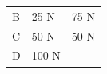 \begin{enumerate}[noitemsep, label=\textbf{\arabic*}. ]
{{\begin{center}
\begin{xtabular}[t]{|l|l|l|}
    
        B &
    
    
        25 N &
    
    
        75 N%
     \tabularnewline{}
    
    
        C &
    
    
        50 N &
    
    
        50 N%
     \tabularnewline{}
    
    
        D &
    
    
        100 N &
    
    

\end{xtabular}
\end{center}}}
\end{enumerate}
